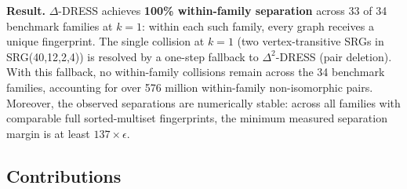\documentclass[11pt,a4paper]{article}
\begin{document}
\noindent \textbf{Result.}
$\Delta$-DRESS achieves \textbf{100\% within-family separation} across 33 of 34 benchmark families at $k = 1$: within each such family, every graph receives a unique fingerprint.
The single collision at $k = 1$ (two vertex-transitive SRGs in SRG(40,12,2,4)) is resolved by a one-step fallback to $\Delta^2$-DRESS (pair deletion).
With this fallback, no within-family collisions remain across the 34 benchmark families, accounting for over 576 million within-family non-isomorphic pairs.
Moreover, the observed separations are numerically stable: across all families with comparable full sorted-multiset fingerprints, the minimum measured separation margin is at least $137 \times \epsilon$.

\subsection{Contributions}
\end{document}
